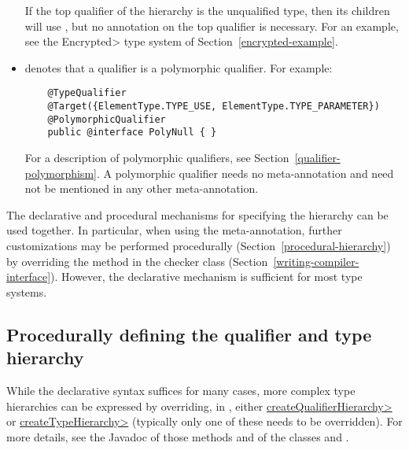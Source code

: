 \begin{itemize}
  If the top qualifier of the hierarchy is the unqualified type, then its children
  will use , but no  annotation on the top qualifier is necessary.  For an example, see the
  \<Encrypted> type system of Section~\ref{encrypted-example}.

\item {} denotes that a qualifier is a
  polymorphic qualifier.  For example:

  \begin{Verbatim}
    @TypeQualifier
    @Target({ElementType.TYPE_USE, ElementType.TYPE_PARAMETER})
    @PolymorphicQualifier
    public @interface PolyNull { }
  \end{Verbatim}

  For a description of polymorphic qualifiers, see
  Section~\ref{qualifier-polymorphism}.  A polymorphic qualifier needs
  no  meta-annotation and need not be
  mentioned in any other 
  meta-annotation.

\end{itemize}

The declarative and procedural mechanisms for specifying the hierarchy can
be used together.  In particular, when using the 
meta-annotation, further customizations may be
performed procedurally (Section~\ref{procedural-hierarchy})
by overriding the \href{api/org/checkerframework/framework/util/GraphQualifierHierarchy.html#isSubtype-java.util.Collection-java.util.Collection-}{} method in the checker class
(Section~\ref{writing-compiler-interface}).
However, the declarative mechanism is sufficient for most type systems.


\subsection{Procedurally defining the qualifier and type hierarchy\label{procedural-hierarchy}}

While the declarative syntax suffices for many cases, more complex
type hierarchies can be expressed by overriding, in ,
either \href{api/org/checkerframework/framework/type/AnnotatedTypeFactory.html#createQualifierHierarchy--}{\<createQualifierHierarchy>} or \href{api/org/checkerframework/framework/type/AnnotatedTypeFactory.html#createTypeHierarchy--}{\<createTypeHierarchy>} (typically
only one of these needs to be overridden).
For more details, see the Javadoc of those methods and of the classes
 and .

